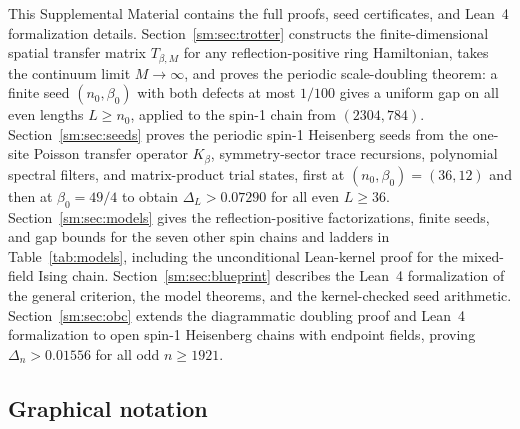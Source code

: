 \medskip
\noindent
This Supplemental Material contains the full proofs, seed
certificates, and Lean~4 formalization details.
Section~\ref{sm:sec:trotter} constructs the finite-dimensional spatial
transfer matrix $T_{\beta,M}$ for any reflection-positive ring
Hamiltonian, takes the continuum limit $M\to\infty$, and proves the
periodic scale-doubling theorem: a finite seed $(n_0,\beta_0)$ with both
defects at most $1/100$ gives a uniform gap on all even lengths
$L\ge n_0$, applied to the spin-1 chain from $(2304,784)$.
Section~\ref{sm:sec:seeds} proves the periodic spin-1 Heisenberg seeds
from the one-site Poisson transfer operator $K_\beta$, symmetry-sector
trace recursions, polynomial spectral filters, and matrix-product trial
states, first at $(n_0,\beta_0)=(36,12)$ and then at $\beta_0=49/4$ to
obtain $\Delta_L>0.07290$ for all even $L\ge36$.
Section~\ref{sm:sec:models} gives the reflection-positive
factorizations, finite seeds, and gap bounds for the seven other spin
chains and ladders in Table~\ref{tab:models}, including the
unconditional Lean-kernel proof for the mixed-field Ising chain.
Section~\ref{sm:sec:blueprint} describes the Lean~4 formalization of the
general criterion, the model theorems, and the kernel-checked seed
arithmetic. Section~\ref{sm:sec:obc} extends the diagrammatic doubling
proof and Lean~4 formalization to open spin-1 Heisenberg chains with
endpoint fields, proving $\Delta_n>0.01556$ for all odd $n\ge1921$.

\tableofcontents

\subsection*{Graphical notation}
\label{sm:sec:notation}

